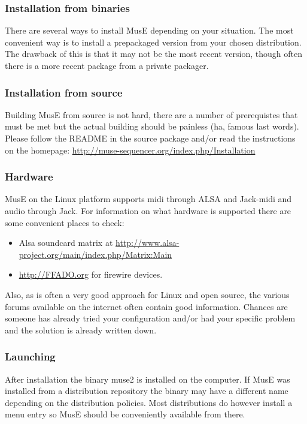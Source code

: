 \documentclass[a4paper]{report}
\begin{document}
\subsubsection{Installation from binaries}
There are several ways to install MusE depending on your situation. The
most convenient way is to install a prepackaged version from your chosen
distribution. The drawback of this is that it may not be the most recent
version, though often there is a more recent package from a private packager.
\subsubsection{Installation from source}
Building MusE from source is not hard, there are a number of prerequistes
that must be met but the actual building should be painless (ha, famous
last words).\\
Please follow the README in the source package and/or read the instructions
on the homepage: \url{http://muse-sequencer.org/index.php/Installation}

\subsubsection{Hardware}
MusE on the Linux platform supports midi through ALSA and Jack-midi and audio
through Jack. For information on what hardware is supported there are some
convenient places to check:
\begin{itemize}
\item Alsa soundcard matrix at 
\url{http://www.alsa-project.org/main/index.php/Matrix:Main} 
\item \url{http://FFADO.org} for firewire devices. 
\end{itemize}
Also, as is often a very good approach for Linux and open source, the
various forums available on the internet often contain good information.
Chances are someone has already tried your configuration and/or had your
specific problem and the solution is already written down.
\subsubsection{Launching}
After installation the binary muse2 is installed on the computer. If MusE
was installed from a distribution repository the binary may have a
different name depending on the distribution policies. Most distributions
do however install a menu entry so MusE should be conveniently available
from there.
\end{document}
